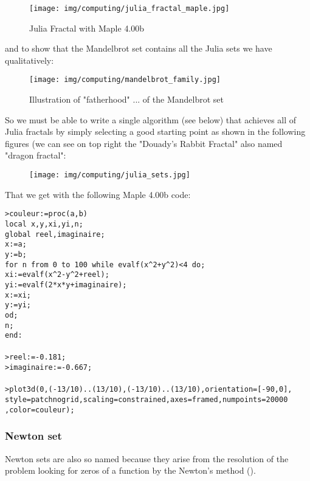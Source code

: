 	\begin{figure}[H]
		\centering
		\texttt{[image: img/computing/julia\_fractal\_maple.jpg]}
		\caption{Julia Fractal with Maple 4.00b}
	\end{figure}
	and to show that the Mandelbrot set contains all the Julia sets we have qualitatively:
	\begin{figure}[H]
		\centering
		\texttt{[image: img/computing/mandelbrot\_family.jpg]}
		\caption{Illustration of "fatherhood" ... of the Mandelbrot set}
	\end{figure}
	So we must be able to write a single algorithm (see below) that achieves all of Julia fractals by simply selecting a good starting point as shown in the following figures (we can see on top right the "Douady's Rabbit Fractal" also named "dragon fractal":
	\begin{figure}[H]
		\centering
		\texttt{[image: img/computing/julia\_sets.jpg]}
	\end{figure}
	That we get with the following Maple 4.00b  code:
	
	\texttt{>couleur:=proc(a,b)\\
	local x,y,xi,yi,n;\\
	global reel,imaginaire;\\
	x:=a;\\
	y:=b;\\
	for n from 0 to 100 while evalf(x\string^2+y\string^2)<4 do;\\
	xi:=evalf(x\string^2-y\string^2+reel);\\
	yi:=evalf(2*x*y+imaginaire);\\
	x:=xi;\\
	y:=yi;\\
	od;\\
	n;\\
	end:\\\\
	>reel:=-0.181;\\
	>imaginaire:=-0.667;\\\\
	>plot3d(0,(-13/10)..(13/10),(-13/10)..(13/10),orientation=[-90,0], style=patchnogrid,scaling=constrained,axes=framed,numpoints=20000
	,color=couleur);\\}
	
	\subsubsection{Newton set}
	Newton sets are also so named because they arise from the resolution of the problem looking for zeros of a function by the Newton's method ().


